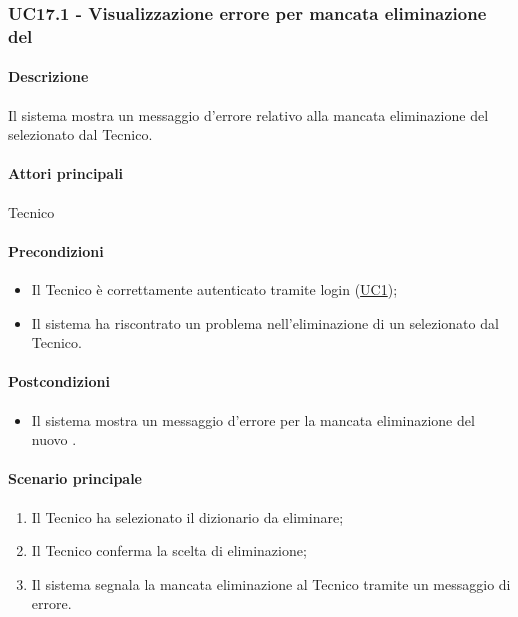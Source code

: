 
\subsubsection{UC17.1 - Visualizzazione errore per mancata eliminazione del }\label{UC17point1}
\paragraph*{Descrizione}
Il sistema mostra un messaggio d’errore relativo alla mancata eliminazione del  selezionato dal Tecnico.

\paragraph*{Attori principali}
Tecnico

\paragraph*{Precondizioni}
\begin{itemize}
  \item Il Tecnico è correttamente autenticato tramite login (\hyperref[UC1]{UC1});
  \item Il sistema ha riscontrato un problema nell'eliminazione di un  selezionato dal Tecnico.
\end{itemize}

\paragraph*{Postcondizioni}
\begin{itemize}
  \item Il sistema mostra un messaggio d’errore per la mancata eliminazione del nuovo .
\end{itemize}

\paragraph*{Scenario principale}
\begin{enumerate}
  \item Il Tecnico ha selezionato il dizionario da eliminare;
  \item Il Tecnico conferma la scelta di eliminazione;
  \item Il sistema segnala la mancata eliminazione al Tecnico tramite un messaggio di errore.
\end{enumerate}
